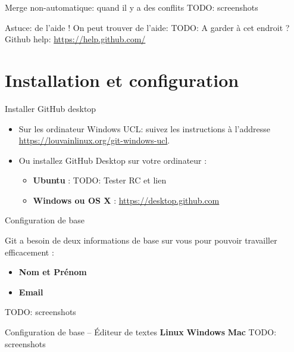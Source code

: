 \documentclass{beamer}
\begin{document}
\begin{frame}{Merge non-automatique: quand il y a des conflits}
    TODO: screenshots
\end{frame}

\begin{frame}{Astuce: de l'aide !}
    On peut trouver de l'aide:
    TODO: A garder à cet endroit ?
        Github help: \url{https://help.github.com/}
\end{frame}


\section{Installation et configuration}

\begin{frame}{Installer GitHub desktop}
\begin{itemize}
    \item Sur les ordinateur Windows UCL: suivez les instructions à l'addresse {\small\url{https://louvainlinux.org/git-windows-ucl}}.
    \item Ou installez GitHub Desktop sur votre ordinateur :
    \begin{itemize}
        \item \textbf{Ubuntu} : TODO: Tester RC et lien
        \item \textbf{Windows ou OS X} : \url{https://desktop.github.com}
    \end{itemize}
\end{itemize}
\end{frame}

\begin{frame}{Configuration de base}

Git a besoin de deux informations de base sur vous pour pouvoir travailler
efficacement :

\begin{itemize}
\item \textbf{Nom et Prénom}
\item \textbf{Email}
\end{itemize}
TODO: screenshots

\end{frame}

\begin{frame}{Configuration de base -- Éditeur de textes}
    \textbf{Linux}
    \textbf{Windows}
    \textbf{Mac}
    TODO: screenshots
\end{frame}
\end{document}
